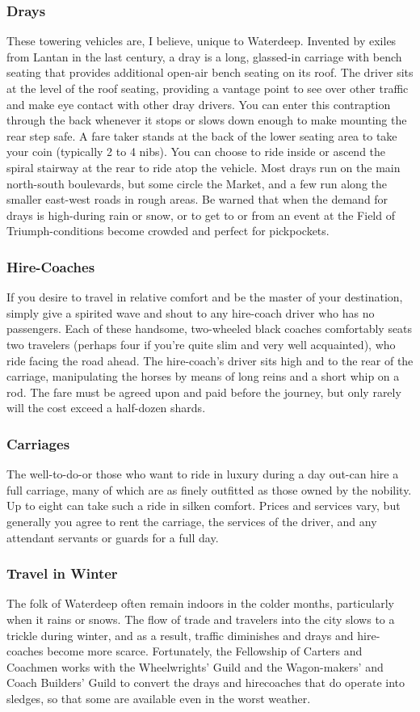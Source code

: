 \documentclass[10pt,a4paper,twoside,twocolumn,openany,nodeprecatedcode]{dndbook}
\begin{document}
\subsubsection{Drays}
These towering vehicles are, I believe, unique to Waterdeep. Invented by exiles from Lantan in the last century, a dray is a long, glassed-in carriage with bench seating that provides additional open-air bench seating on its roof. The driver sits at the level of the roof seating, providing a vantage point to see over other traffic and make eye contact with other dray drivers. You can enter this contraption through the back whenever it stops or slows down enough to make mounting the rear step safe.
A fare taker stands at the back of the lower seating area to take your coin (typically 2 to 4 nibs). You can choose to ride inside or ascend the spiral stairway at the rear to ride atop the vehicle. Most drays run on the main north-south boulevards, but some circle the Market, and a few run along the smaller east-west roads in rough areas. Be warned that when the demand for drays is high-during rain or snow, or to get to or from an event at the Field of Triumph-conditions become crowded and perfect for pickpockets.
\subsubsection{Hire-Coaches}
If you desire to travel in relative comfort and be the master of your destination, simply give a spirited wave and shout to any hire-coach driver who has no passengers. Each of these handsome, two-wheeled black coaches comfortably seats two travelers (perhaps four if you're quite slim and very well acquainted), who ride facing the road ahead. The hire-coach's driver sits high and to the rear of the carriage, manipulating the horses by means of long reins and a short whip on a rod. The fare must be agreed upon and paid before the journey, but only rarely will the cost exceed a half-dozen shards.
\subsubsection{Carriages}
The well-to-do-or those who want to ride in luxury during a day out-can hire a full carriage, many of which are as finely outfitted as those owned by the nobility. Up to eight can take such a ride in silken comfort. Prices and services vary, but generally you agree to rent the carriage, the services of the driver, and any attendant servants or guards for a full day.
\subsubsection{Travel in Winter}
The folk of Waterdeep often remain indoors in the colder months, particularly when it rains or snows. The flow of trade and travelers into the city slows to a trickle during winter, and as a result, traffic diminishes and drays and hire-coaches become more scarce. Fortunately, the Fellowship of Carters and Coachmen works with the Wheelwrights' Guild and the Wagon-makers' and Coach Builders' Guild to convert the drays and hirecoaches that do operate into sledges, so that some are available even in the worst weather.
\end{document}
